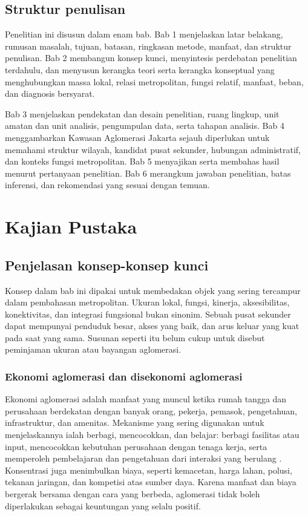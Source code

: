\documentclass[11pt,a4paper,oneside,openany,indonesian]{report}
\begin{document}
\section{Struktur penulisan}

Penelitian ini disusun dalam enam bab. Bab 1 menjelaskan latar belakang, rumusan masalah, tujuan, batasan, ringkasan metode, manfaat, dan struktur penulisan. Bab 2 membangun konsep kunci, menyintesis perdebatan penelitian terdahulu, dan menyusun kerangka teori serta kerangka konseptual yang menghubungkan massa lokal, relasi metropolitan, fungsi relatif, manfaat, beban, dan diagnosis bersyarat.

Bab 3 menjelaskan pendekatan dan desain penelitian, ruang lingkup, unit amatan dan unit analisis, pengumpulan data, serta tahapan analisis. Bab 4 menggambarkan Kawasan Aglomerasi Jakarta sejauh diperlukan untuk memahami struktur wilayah, kandidat pusat sekunder, hubungan administratif, dan konteks fungsi metropolitan. Bab 5 menyajikan serta membahas hasil menurut pertanyaan penelitian. Bab 6 merangkum jawaban penelitian, batas inferensi, dan rekomendasi yang sesuai dengan temuan.

\clearpage

\chapter{Kajian Pustaka}

\section{Penjelasan konsep-konsep kunci}

Konsep dalam bab ini dipakai untuk membedakan objek yang sering tercampur dalam pembahasan metropolitan. Ukuran lokal, fungsi, kinerja, aksesibilitas, konektivitas, dan integrasi fungsional bukan sinonim. Sebuah pusat sekunder dapat mempunyai penduduk besar, akses yang baik, dan arus keluar yang kuat pada saat yang sama. Susunan seperti itu belum cukup untuk disebut peminjaman ukuran atau bayangan aglomerasi.

\subsection{Ekonomi aglomerasi dan disekonomi aglomerasi}

Ekonomi aglomerasi adalah manfaat yang muncul ketika rumah tangga dan perusahaan berdekatan dengan banyak orang, pekerja, pemasok, pengetahuan, infrastruktur, dan amenitas. Mekanisme yang sering digunakan untuk menjelaskannya ialah berbagi, mencocokkan, dan belajar: berbagi fasilitas atau input, mencocokkan kebutuhan perusahaan dengan tenaga kerja, serta memperoleh pembelajaran dan pengetahuan dari interaksi yang berulang \parencite{durantonpuga2004}. Konsentrasi juga menimbulkan biaya, seperti kemacetan, harga lahan, polusi, tekanan jaringan, dan kompetisi atas sumber daya. Karena manfaat dan biaya bergerak bersama dengan cara yang berbeda, aglomerasi tidak boleh diperlakukan sebagai keuntungan yang selalu positif.
\end{document}
